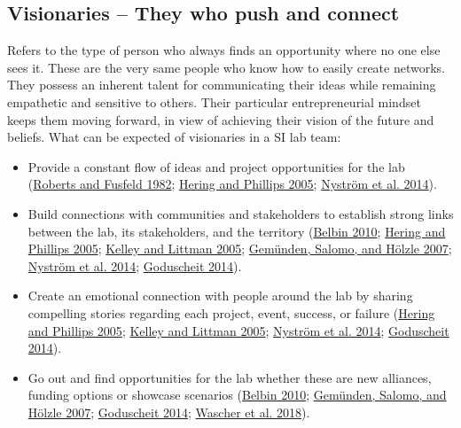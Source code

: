 \documentclass[AMA,STIX1COL,APA,STIX2COL]{WileyNJD-v2}
\providecommand{\tightlist}{%
  \setlength{\itemsep}{0pt}\setlength{\parskip}{0pt}}
\begin{document}
\hypertarget{visionaries-they-who-push-and-connect}{%
\subsection{Visionaries -- They who push and
connect}\label{visionaries-they-who-push-and-connect}}

Refers to the type of person who always finds an opportunity where no
one else sees it. These are the very same people who know how to easily
create networks. They possess an inherent talent for communicating their
ideas while remaining empathetic and sensitive to others. Their
particular entrepreneurial mindset keeps them moving forward, in view of
achieving their vision of the future and beliefs. What can be expected
of visionaries in a SI lab team:

\begin{itemize}
\tightlist
\item
  Provide a constant flow of ideas and project opportunities for the lab
  (\protect\hyperlink{ref-Roberts1982}{Roberts and Fusfeld 1982};
  \protect\hyperlink{ref-Hering2005}{Hering and Phillips 2005};
  \protect\hyperlink{ref-Nystrom2014}{Nyström et al. 2014}).
\item
  Build connections with communities and stakeholders to establish
  strong links between the lab, its stakeholders, and the territory
  (\protect\hyperlink{ref-Belbin2010}{Belbin 2010};
  \protect\hyperlink{ref-Hering2005}{Hering and Phillips 2005};
  \protect\hyperlink{ref-Kelley2005}{Kelley and Littman 2005};
  \protect\hyperlink{ref-Gemunden2007}{Gemünden, Salomo, and Hölzle
  2007}; \protect\hyperlink{ref-Nystrom2014}{Nyström et al. 2014};
  \protect\hyperlink{ref-Goduscheit2014}{Goduscheit 2014}).
\item
  Create an emotional connection with people around the lab by sharing
  compelling stories regarding each project, event, success, or failure
  (\protect\hyperlink{ref-Hering2005}{Hering and Phillips 2005};
  \protect\hyperlink{ref-Kelley2005}{Kelley and Littman 2005};
  \protect\hyperlink{ref-Nystrom2014}{Nyström et al. 2014};
  \protect\hyperlink{ref-Goduscheit2014}{Goduscheit 2014}).
\item
  Go out and find opportunities for the lab whether these are new
  alliances, funding options or showcase scenarios
  (\protect\hyperlink{ref-Belbin2010}{Belbin 2010};
  \protect\hyperlink{ref-Gemunden2007}{Gemünden, Salomo, and Hölzle
  2007}; \protect\hyperlink{ref-Goduscheit2014}{Goduscheit 2014};
  \protect\hyperlink{ref-Wascher2018}{Wascher et al. 2018}).
\end{itemize}
\end{document}
